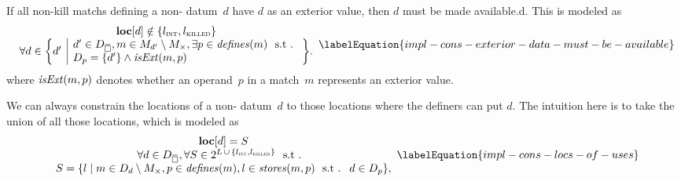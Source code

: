 If all non-\glspl{kill match} defining a non-
\gls{datum}~$d$ have $d$ as an \gls{exterior value}, then $d$ must be made
\gls{available.d}.
%
This is modeled as
%
\begin{equation}
  \begin{array}{c}
    \mVar{loc}[d] \notin \mSet{\mIntLocation, \mKilledLocation} \\
    \forall d \in
      \mSetBuilder*{d'}%
                   {%
                     \begin{array}{@{}l@{}}
                       d' \in \mStateDataCompSet,
                       m \in \mMatchSet[d'] \setminus \mKillMatchSet,
                       \exists p \in \mDefines(m) \text{ \st} \\
                       \mDataSet[p] = \mSet{d'}
                       \mAnd
                       \mIsExt(m, p)
                     \end{array}
                   } \!.
  \end{array}
  \labelEquation{impl-cons-exterior-data-must-be-available}
\end{equation}
%
where \mbox{$\operatorname{\textrm{\textit{isExt}}}(m, p)$} denotes whether an \gls{operand}~$p$ in a
\gls{match}~$m$ represents an \gls{exterior value}.

We can always constrain the \glspl{location} of a non-
\gls{datum}~$d$ to those \glspl{location} where the definers can put $d$.
%
The intuition here is to take the union of all those \glspl{location}, which is
modeled as
%
\begin{equation}
  \begin{array}{c}
    \mVar{loc}[d] = S \\
    \forall d \in \mStateDataCompSet,
    \forall S \in
      \mPowerset{\mLocationSet
      \, \cup \,
      \mSet{\mIntLocation, \mKilledLocation}} \text{ \st} \\
    S = \mSetBuilder{l}%
                    {%
                      m \in \mDataSet[d] \setminus \mKillMatchSet,
                      p \in \mDefines(m),
                      l \in \mStores(m, p)
                      \text{ \st }
                      d \in \mDataSet[p]
                    },
  \end{array}
  \labelEquation{impl-cons-locs-of-uses}
\end{equation}

